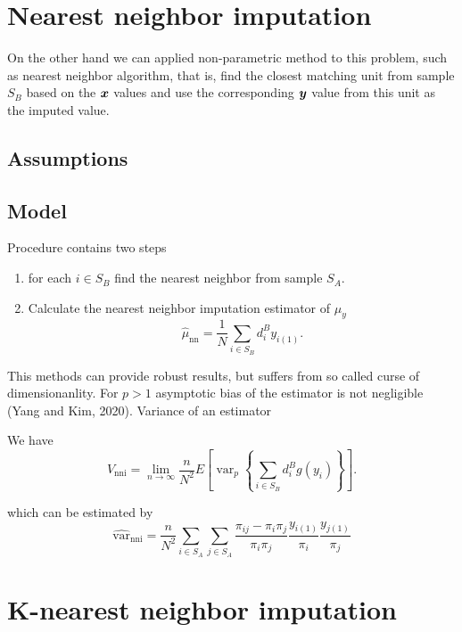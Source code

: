 \documentclass[
  letterpaper,
  DIV=11,
  numbers=noendperiod]{scrreprt}
\begin{document}
\section{Nearest neighbor imputation}\label{nearest-neighbor-imputation}

On the other hand we can applied non-parametric method to this problem,
such as nearest neighbor algorithm, that is, find the closest matching
unit from sample \(S_B\) based on the \(\boldsymbol{x}\) values and use the
corresponding \(\boldsymbol{y}\) value from this unit as the imputed value.

\subsection{Assumptions}\label{assumptions}

\subsection{Model}\label{model}

Procedure contains two steps

\begin{enumerate}
\def\labelenumi{\arabic{enumi}.}
\item
  for each \(i \in S_B\) find the nearest neighbor from sample \(S_A\).
\item
  Calculate the nearest neighbor imputation estimator of \(\mu_y\) \[
  \begin{equation}
  \hat{\mu}_\mathrm{nn}=\frac{1}{N} \sum_{i \in S_B} d_i^B y_{i(1)} .
  \end{equation}
  \]
\end{enumerate}

This methods can provide robust results, but suffers from so called
curse of dimensionanlity. For \(p > 1\) asymptotic bias of the estimator
is not negligible (Yang and Kim, 2020). Variance of an estimator

We have \[
V_{\mathrm{nni}}=\lim _{n \rightarrow \infty} \frac{n}{N^2} E\left[\operatorname{var}_p\left\{\sum_{i \in S_B} d_i^B g\left(y_i\right)\right\}\right] .
\]

which can be estimated by \[
\hat{\text{var}}_{\mathrm{nni}}=\frac{n}{N^2} \sum_{i \in S_A} \sum_{j \in S_A} \frac{\pi_{i j}-\pi_i \pi_j}{\pi_i \pi_j} \frac{y_{i(1)}}{\pi_i} \frac{y_{j(1)}}{\pi_j}
\]

\section{K-nearest neighbor
imputation}\label{k-nearest-neighbor-imputation}
\end{document}
